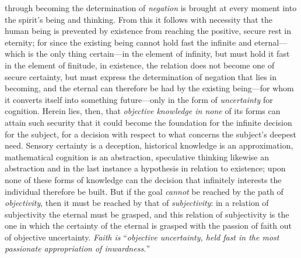 \documentclass[12pt,a4paper]{book}
\begin{document}
through becoming the determination of \emph{negation} is brought at every
moment into the spirit's being and thinking. From this it follows with
necessity that the human being is prevented by existence from reaching
the positive, secure rest in eternity; for since the existing being
cannot hold fast the infinite and eternal---which is the only thing
certain---in the element of infinity, but must hold it fast in the
element of finitude, in existence, the relation does not become one of
secure certainty, but must express the determination of negation that
lies in becoming, and the eternal can therefore be had by the existing
being---for whom it converts itself into something future---only in the
form of \emph{uncertainty} for cognition. Herein lies, then, that \emph{objective
knowledge in none} of its forms can attain such security that it could
become the foundation for the infinite decision for the subject, for a
decision with respect to what concerns the subject's deepest need.
Sensory certainty is a deception, historical knowledge is an
approximation, mathematical cognition is an abstraction, speculative
thinking likewise an abstraction and in the last instance a hypothesis
in relation to existence; upon none of these forms of knowledge can the
decision that infinitely interests the individual therefore be built.
But if the goal \emph{cannot} be reached by the path of \emph{objectivity}, then it
must be reached by that of \emph{subjectivity}: in a relation of subjectivity
the eternal must be grasped, and this relation of subjectivity is the
one in which the certainty of the eternal is grasped with the passion
of faith out of objective uncertainty. \emph{Faith is} ``\emph{objective uncertainty,
held fast in the most passionate appropriation of inwardness.}''
\end{document}
